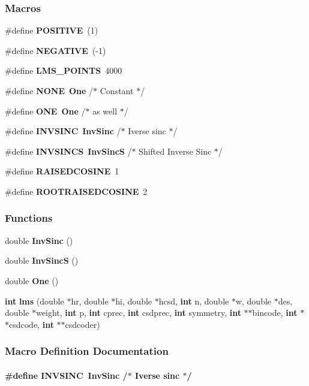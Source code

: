 \subsubsection*{Macros}
\begin{DoxyCompactItemize}
\item 
\#define {\bf P\+O\+S\+I\+T\+I\+VE}~(1)
\item 
\#define {\bf N\+E\+G\+A\+T\+I\+VE}~(-\/1)
\item 
\#define {\bf L\+M\+S\+\_\+\+P\+O\+I\+N\+TS}~4000
\item 
\#define {\bf N\+O\+NE}~{\bf One}		/$\ast$ Constant $\ast$/
\item 
\#define {\bf O\+NE}~{\bf One}		/$\ast$ as well $\ast$/
\item 
\#define {\bf I\+N\+V\+S\+I\+NC}~{\bf Inv\+Sinc}		/$\ast$ Iverse sinc $\ast$/
\item 
\#define {\bf I\+N\+V\+S\+I\+N\+CS}~{\bf Inv\+SincS}	/$\ast$ Shifted Inverse Sinc $\ast$/
\item 
\#define {\bf R\+A\+I\+S\+E\+D\+C\+O\+S\+I\+NE}~1
\item 
\#define {\bf R\+O\+O\+T\+R\+A\+I\+S\+E\+D\+C\+O\+S\+I\+NE}~2
\end{DoxyCompactItemize}
\subsubsection*{Functions}
\begin{DoxyCompactItemize}
\item 
double {\bf Inv\+Sinc} ()
\item 
double {\bf Inv\+SincS} ()
\item 
double {\bf One} ()
\item 
{\bf int} {\bf lms} (double $\ast$hr, double $\ast$hi, double $\ast$hcsd, {\bf int} n, double $\ast$w, double $\ast$des, double $\ast$weight, {\bf int} p, {\bf int} cprec, {\bf int} csdprec, {\bf int} symmetry, {\bf int} $\ast$$\ast$bincode, {\bf int} $\ast$$\ast$csdcode, {\bf int} $\ast$$\ast$csdcoder)
\end{DoxyCompactItemize}


\subsubsection{Macro Definition Documentation}
\paragraph[{I\+N\+V\+S\+I\+NC}]{\setlength{\rightskip}{0pt plus 5cm}\#define I\+N\+V\+S\+I\+NC~{\bf Inv\+Sinc}		/$\ast$ Iverse sinc $\ast$/}\label{lms_8h_a779f6b0bf48d68c12bb90544ede149b8}


